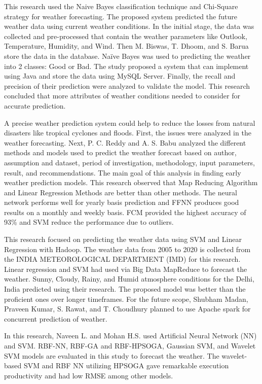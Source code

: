 \documentclass[conference]{IEEEtran}
\begin{document}
This research \cite{Munmun} used the Naive Bayes classification technique and Chi-Square strategy for weather forecasting. The proposed system predicted the future weather data using current weather conditions. In the initial stage, the data was collected and pre-processed that contain the weather parameters like Outlook, Temperature, Humidity, and Wind. Then M.  Biswas,  T.  Dhoom,  and  S.  Barua \cite{Munmun} store the data in the database. Naïve Bayes was used to predicting the weather into 2 classes: Good or Bad. The study\cite{Munmun} proposed a system that can implement using Java and store the data using MySQL Server. Finally, the recall and precision of their prediction were analyzed to validate the model. This research\cite{Munmun} concluded that more attributes of weather conditions needed to consider for accurate prediction.

A precise weather prediction system could help to reduce the losses from natural disasters like tropical cyclones and floods. First,  the issues were analyzed in the weather forecasting. Next, P.  C.  Reddy  and  A.  S.  Babu \cite{8117883} analyzed the different methods and models used to predict the weather forecast based on author, assumption and dataset, period of investigation, methodology, input parameters, result, and recommendations. The main goal of this analysis in finding early weather prediction models. This research \cite{8117883}  observed that Map Reducing Algorithm and Linear Regression Methods are better than other methods.  The neural network performs well for yearly basis prediction and FFNN produces good results on a monthly and weekly basis. FCM provided the highest accuracy of 93\% and SVM reduce the performance due to outliers. 

This research\cite{8441679}  focused on predicting the weather data using SVM and Linear Regression with Hadoop. The weather data from 2005 to 2020 is collected from the INDIA METEOROLOGICAL DEPARTMENT (IMD) for this research. Linear regression and SVM had used via Big Data MapReduce to forecast the weather. Sunny, Cloudy, Rainy, and Humid atmosphere conditions for the Delhi, India predicted using their research. The proposed model was better than the proficient ones over longer timeframes. For the future scope, Shubham Madan, Praveen Kumar, S. Rawat, and T. Choudhury \cite{8441679}  planned to use Apache spark for concurrent prediction of weather.


In this research, \cite{8819643} Naveen L. and Mohan H.S. used Artificial Neural Network (NN) and SVM. RBF-NN, RBF-GA and RBF-HPSOGA, Gaussian SVM, and Wavelet SVM models are evaluated in this study\cite{8819643}  to forecast the weather. The wavelet-based SVM and RBF NN utilizing HPSOGA gave remarkable execution productivity and had low RMSE among other models.
\end{document}

